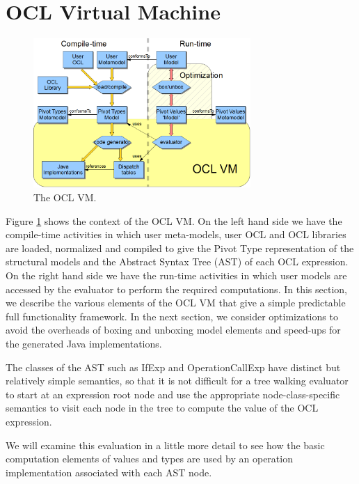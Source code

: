 \documentclass{acm_proc_article-sp}
\begin{document}
\section{OCL Virtual Machine}\label{VM now}

\begin{figure}
  \begin{center}
    \includegraphics[width=3.25in]{OCL2012OCLVM.png}
  \end{center}
  \caption{The OCL VM.}
  \label{fig:OCLVM}
\end{figure}

Figure \ref{fig:OCLVM} shows the context of the OCL VM. On the left hand side we have the compile-time activities in which
user meta-models, user OCL and OCL libraries are loaded, normalized and compiled to give the Pivot Type representation
of the structural models and the Abstract Syntax Tree (AST) of each OCL expression.
On the right hand side we have the run-time activities in which user models are accessed by the evaluator to perform the required computations. In this section, we describe the various elements of the OCL VM that give a simple predictable full functionality framework. In the next section, we consider optimizations to avoid the overheads of boxing and unboxing model elements
and speed-ups for the generated Java implementations.
  
The classes of the AST such as IfExp and OperationCallExp have distinct but relatively simple semantics, so that it is not difficult for a tree walking evaluator to start at an expression root node and use the appropriate
node-class-specific semantics to visit each node in the tree to compute the value of the OCL expression. 

We will examine this evaluation in a little more detail to see how the basic computation elements of values and types
are used by an operation implementation associated with each AST node.
\end{document}
